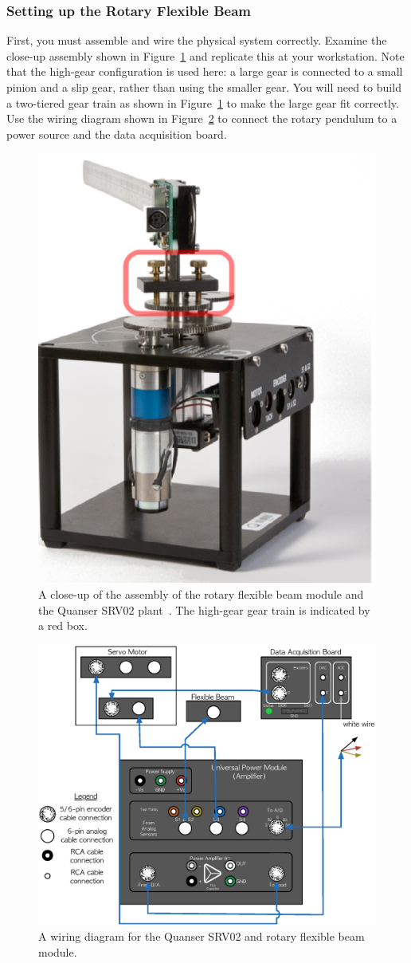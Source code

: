 \subsubsection{Setting up the Rotary Flexible Beam}\label{sub subsection:lab1_setup}
First, you must assemble and wire the physical system correctly. Examine the close-up assembly shown in Figure~\ref{fig:lab1_assembly} and replicate this at your workstation. Note that the high-gear configuration is used here: a large gear is connected to a small pinion and a slip gear, rather than using the smaller gear. You will need to build a two-tiered gear train as shown in Figure~\ref{fig:lab1_assembly} to make the large gear fit correctly. Use the wiring diagram shown in Figure~\ref{fig:lab1_wiring} to connect the rotary pendulum to a power source and the data acquisition board.
\begin{figure}[htb!]
    \centering
    \includegraphics[width=.3\linewidth]{eps/lab_1/assembly.eps}
    \caption{A close-up of the assembly of the rotary flexible beam module and the Quanser SRV02 plant~\cite{Q-Flex-Beam}. The high-gear gear train is indicated by a red box.}
    \label{fig:lab1_assembly}
\end{figure}
\begin{figure}[htb!]
    \centering
    \includegraphics[width=.8\linewidth]{eps/lab_1/wiring.eps}
    \caption{A wiring diagram for the Quanser SRV02 and rotary flexible beam module.}
    \label{fig:lab1_wiring}
\end{figure}


